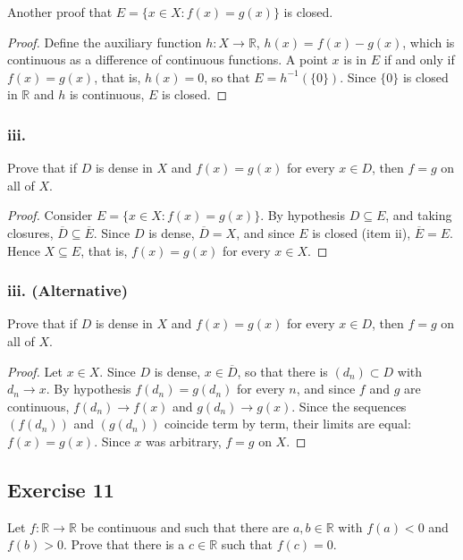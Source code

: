 \documentclass[11pt, a4paper]{article}
\begin{document}
Another proof that $E = \{x \in X : f(x) = g(x)\}$ is closed.

\begin{proof}
Define the auxiliary function $h: X \to \mathbb{R}$, $h(x) = f(x) - g(x)$, which is continuous as a
difference of continuous functions. A point $x$ is in $E$ if and only if $f(x) = g(x)$, that is, $h(x) = 0$, so
that $E = h^{-1}(\{0\})$. Since $\{0\}$ is closed in $\mathbb{R}$ and $h$ is continuous, $E$ is closed.
\end{proof}

\subsubsection*{iii.}
Prove that if $D$ is dense in $X$ and $f(x) = g(x)$ for every $x \in D$, then $f = g$ on all of $X$.

\begin{proof}
Consider $E = \{x \in X : f(x) = g(x)\}$. By hypothesis $D \subseteq E$, and taking closures,
$\overline{D} \subseteq \overline{E}$. Since $D$ is dense, $\overline{D} = X$, and since $E$ is closed
(item ii), $\overline{E} = E$. Hence $X \subseteq E$, that is, $f(x) = g(x)$ for every $x \in X$.
\end{proof}

\subsubsection*{iii. (Alternative)}
Prove that if $D$ is dense in $X$ and $f(x) = g(x)$ for every $x \in D$, then $f = g$ on all of $X$.

\begin{proof}
Let $x \in X$. Since $D$ is dense, $x \in \overline{D}$, so that there is $(d_n) \subset D$ with
$d_n \to x$. By hypothesis $f(d_n) = g(d_n)$ for every $n$, and since $f$ and $g$ are continuous,
$f(d_n) \to f(x)$ and $g(d_n) \to g(x)$. Since the sequences $(f(d_n))$ and $(g(d_n))$ coincide term
by term, their limits are equal: $f(x) = g(x)$. Since $x$ was arbitrary, $f = g$ on $X$.
\end{proof}

\subsection*{Exercise 11}

Let $f: \mathbb{R} \to \mathbb{R}$ be continuous and such that there are $a, b \in \mathbb{R}$ with $f(a) < 0$ and
$f(b) > 0$. Prove that there is a $c \in \mathbb{R}$ such that $f(c) = 0$.
\end{document}
